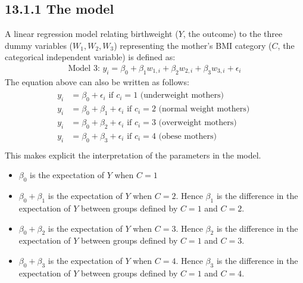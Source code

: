 \documentclass[letterpaper,10pt,english]{jupyterBook}
\begin{document}
\subsection{13.1.1 The model}
\label{\detokenize{13.b. Linear Regression II:the-model}}
\sphinxAtStartPar
A linear regression model relating birthweight (\(Y\), the outcome) to the three dummy variables (\(W_1, W_2, W_3\)) representing the mother’s BMI category (\(C\), the categorical independent variable) is defined as:
\begin{equation*}
\begin{split}
\text{Model 3: } y_i = \beta_0 + \beta_{1}w_{1,i} + \beta_{2}w_{2,i} + \beta_{3}w_{3,i}  + \epsilon_i 
\end{split}
\end{equation*}
\sphinxAtStartPar
The equation above can also be written as follows:
\begin{equation*}
\begin{split}
\begin{align}
y_i &= \beta_0 + \epsilon_i \text{ if } c_i=1 \text{ (underweight mothers) }  \\
y_i &= \beta_0 + \beta_1 +  \epsilon_i \text{ if } c_i=2 \text{ (normal weight mothers) } \\
y_i &= \beta_0 + \beta_2 + \epsilon_i \text{ if } c_i=3 \text{ (overweight mothers) } \\
y_i &= \beta_0 + \beta_3 + \epsilon_i \text{ if } c_i=4 \text{ (obese mothers) }  \\
\end{align}
\end{split}
\end{equation*}
\sphinxAtStartPar
This makes explicit the interpretation of the parameters in the model.
\begin{itemize}
\item {} 
\sphinxAtStartPar
\(\beta_0\) is the expectation of \(Y\) when \(C=1\)

\item {} 
\sphinxAtStartPar
\(\beta_0 + \beta_1\) is the expectation of \(Y\) when \(C=2\). Hence \(\beta_1\) is the difference in the expectation of \(Y\) between groups defined by \(C=1\) and \(C=2\).

\item {} 
\sphinxAtStartPar
\(\beta_0 + \beta_2\) is the expectation of \(Y\) when \(C=3\). Hence \(\beta_2\) is the difference in the expectation of \(Y\) between groups defined by \(C=1\) and \(C=3\).

\item {} 
\sphinxAtStartPar
\(\beta_0 + \beta_3\) is the expectation of \(Y\) when \(C=4\). Hence \(\beta_3\) is the difference in the expectation of \(Y\) between groups defined by \(C=1\) and \(C=4\).

\end{itemize}
\end{document}
